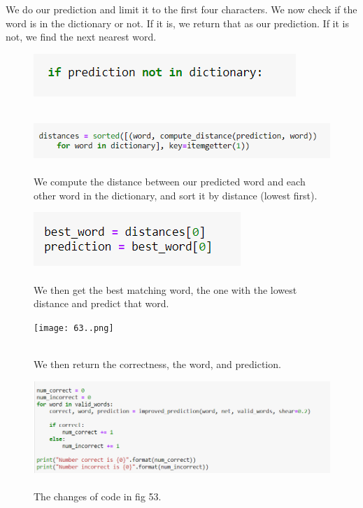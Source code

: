 \documentclass[onecolumn]{article}
\begin{document}
\newpage
\begin{t}
We do our prediction and limit it to the first four characters. We now check if the word is in the dictionary or not. If it is, we return that as our prediction. If it is not, we find the next nearest word.
\end{t}

\begin{figure}[h]
    \centering
    \includegraphics[width=.5\linewidth]{60..png}
\caption{\label{fig:demo-bad}
\\ }
\end{figure}

\begin{figure}[hb!]
    \centering
    \includegraphics[width=.7\linewidth]{61..png}
\caption{\label{fig:demo-bad}
\centering
\\ We compute the distance between our predicted word and each other word in the
dictionary, and sort it by distance (lowest first).}
\end{figure}

\begin{figure}[h]
    \centering
    \includegraphics[width=.5\linewidth]{62..png}
\caption{\label{fig:demo-bad}
\centering
\\We then get the best matching word, the one with the lowest distance and
predict that word. }
\end{figure}

\begin{figure}[hb!]
    \centering
    \texttt{[image: 63..png]}
\caption{\label{fig:demo-bad}
\centering
\\ We then return the correctness, the word, and prediction.}
\end{figure}


\begin{figure}[hb!]
    \centering
    \includegraphics[width=.9\linewidth]{64..png}
\caption{\label{fig:demo-bad}
\centering
\\The changes of code in fig 53.}
\end{figure}
\end{document}
